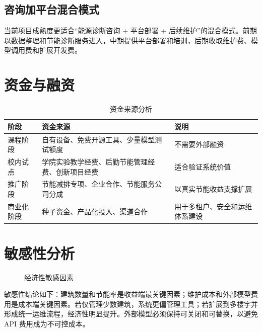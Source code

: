 \documentclass[12pt,a4paper]{ctexart}
\begin{document}
\subsection{咨询加平台混合模式}
当前项目成熟度更适合“能源诊断咨询 + 平台部署 + 后续维护”的混合模式。前期以数据整理和节能诊断服务进入，中期提供平台部署和培训，后期收取维护费、模型调用费和扩展开发费。

\section{资金与融资}
\begin{table}[H]
\centering
\caption{资金来源分析}
\begin{tabularx}{\textwidth}{p{3cm}YY}
\toprule
阶段 & 资金来源 & 说明 \\
\midrule
课程阶段 & 自有设备、免费开源工具、少量模型测试额度 & 不需要外部融资 \\
校内试点 & 学院实验教学经费、后勤节能管理经费、创新项目经费 & 适合验证系统价值 \\
推广阶段 & 节能减排专项、企业合作、节能服务公司分成 & 以真实节能收益支撑扩展 \\
商业化阶段 & 种子资金、产品化投入、渠道合作 & 用于多租户、安全和运维体系建设 \\
\bottomrule
\end{tabularx}
\end{table}

\section{敏感性分析}
\begin{figure}[H]
\centering
{}
\caption{经济性敏感因素}
\end{figure}

敏感性结论如下：建筑数量和节能率是收益端最关键因素；维护成本和外部模型费用是成本端关键因素。若仅管理少数建筑，系统更偏管理工具；若扩展到多楼宇并形成统一运维流程，经济性明显提升。外部模型必须保持可关闭和可替换，以避免 API 费用成为不可控成本。
\end{document}
